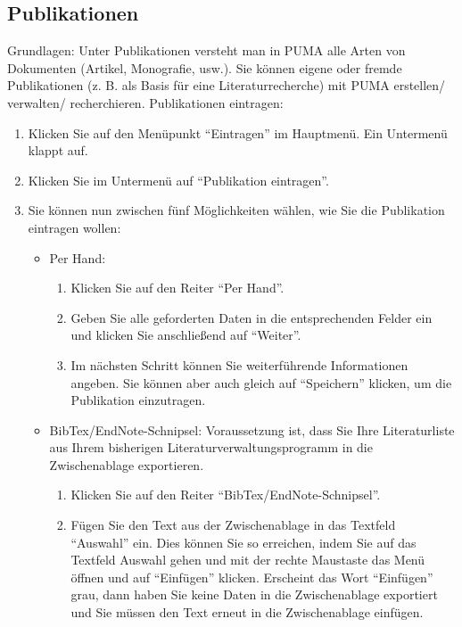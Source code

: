 \documentclass[b5paper,11pt,twoside]{scrbook} %
\begin{document}
\subsection{Publikationen}%
Grundlagen:
\newline
Unter Publikationen versteht man in PUMA alle Arten von Dokumenten (Artikel, Monografie, usw.). Sie können eigene oder fremde Publikationen (z. B. als Basis für eine Literaturrecherche) mit PUMA erstellen/ verwalten/ recherchieren. 
\newline
\newline
Publikationen eintragen:
\begin{enumerate}
    \item Klicken Sie auf den Menüpunkt \enquote{Eintragen} im Hauptmenü. Ein Untermenü klappt auf.
    \item Klicken Sie im Untermenü auf \enquote{Publikation eintragen}.
    \item Sie können nun zwischen fünf Möglichkeiten wählen, wie Sie die Publikation eintragen wollen:
    \begin{itemize}
        \item Per Hand:
        \begin{enumerate}
            \item Klicken Sie auf den Reiter \enquote{Per Hand}.
            \item Geben Sie alle geforderten Daten in die entsprechenden Felder ein und klicken Sie anschließend auf \enquote{Weiter}. 
            \item Im nächsten Schritt können Sie weiterführende Informationen angeben. Sie können aber auch gleich auf \enquote{Speichern} klicken, um die Publikation einzutragen.
        \end{enumerate}
        \item BibTex/EndNote-Schnipsel:
        \newline
        Voraussetzung ist, dass Sie Ihre Literaturliste aus Ihrem bisherigen Literaturverwaltungsprogramm in die Zwischenablage exportieren.
        \begin{enumerate}
            \item Klicken Sie auf den Reiter \enquote{BibTex/EndNote-Schnipsel}.
            \item Fügen Sie den Text aus der Zwischenablage in das Textfeld \enquote{Auswahl} ein. Dies können Sie so erreichen, indem Sie auf das Textfeld Auswahl gehen und mit der rechte Maustaste das Menü öffnen und auf \enquote{Einfügen} klicken. Erscheint das Wort \enquote{Einfügen} grau, dann haben Sie keine Daten in die Zwischenablage exportiert und Sie müssen den Text erneut in die Zwischenablage einfügen.

\end{enumerate}
\end{itemize}
\end{enumerate}
\end{document}
